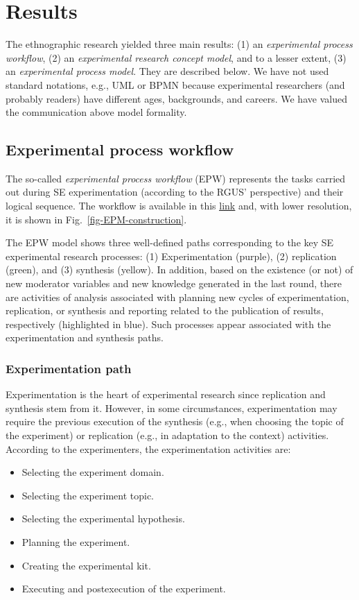 \section{Results}\label{sec-results}
The ethnographic research yielded three main results: (1) an \textit{experimental process workflow}, (2) an \textit{experimental research concept model}, and to a lesser extent, (3) an \textit{experimental process model}. They are described below. We have not used standard notations, e.g., UML or BPMN because experimental researchers (and probably readers) have different ages, backgrounds, and careers. We have valued the communication above model formality.

\subsection{Experimental process workflow}\label{sec-results:process-workflow}

The so-called \textit{experimental process workflow} (EPW) represents the tasks carried out during SE experimentation (according to the RGUS' perspective) and their logical sequence. The workflow is available in this \href{https://zenodo.org/record/7102486#.YyuKruzMLUI}{\ul{link}} and, with lower resolution, it is shown in Fig.~\ref{fig-EPM-construction}.

The EPW model shows three well-defined paths corresponding to the key SE experimental research processes: (1) Experimentation (purple), (2) replication (green), and (3) synthesis (yellow). In addition, based on the existence (or not) of new moderator variables and new knowledge generated in the last round, there are activities of analysis associated with planning new cycles of experimentation, replication, or synthesis and reporting related to the publication of results, respectively (highlighted in blue). Such processes appear associated with the experimentation and synthesis paths.

\subsubsection{Experimentation path}
Experimentation is the heart of experimental research since replication and synthesis stem from it. However, in some circumstances, experimentation may require the previous execution of the synthesis (e.g., when choosing the topic of the experiment) or replication (e.g., in adaptation to the context) activities. According to the experimenters, the experimentation activities are:
\begin{itemize}
	\item Selecting the experiment domain.
	\item Selecting the experiment topic.
	\item Selecting the experimental hypothesis.
	\item Planning the experiment.
	\item Creating the experimental kit.
	\item Executing and postexecution of the experiment.
\end{itemize}

